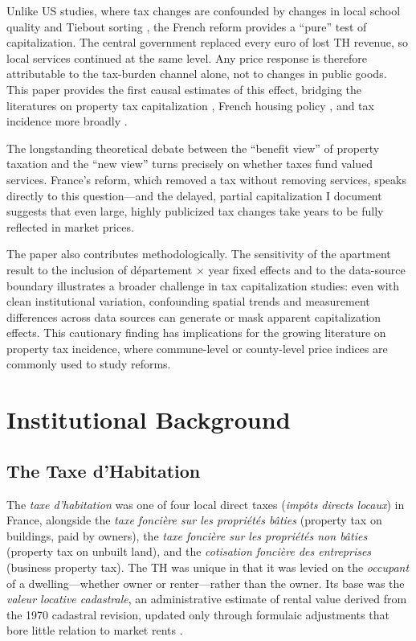 \documentclass[12pt]{article}
\begin{document}
Unlike US studies, where tax changes are confounded by changes in local school quality and Tiebout sorting \citep{oates1969effects, palmon1998property, cellini2010value}, the French reform provides a ``pure'' test of capitalization. The central government replaced every euro of lost TH revenue, so local services continued at the same level. Any price response is therefore attributable to the tax-burden channel alone, not to changes in public goods. This paper provides the first causal estimates of this effect, bridging the literatures on property tax capitalization \citep{hilber2017impact, bradbury2001property}, French housing policy \citep{beaubrun2014residential, bach2023suppression, bonnet2021land}, and tax incidence more broadly \citep{suarez2016benefits, fuest2018property}.

The longstanding theoretical debate between the ``benefit view'' of property taxation \citep{tiebout1956pure, yinger1982capitalization} and the ``new view'' \citep{zodrow2001property} turns precisely on whether taxes fund valued services. France's reform, which removed a tax without removing services, speaks directly to this question---and the delayed, partial capitalization I document suggests that even large, highly publicized tax changes take years to be fully reflected in market prices.

The paper also contributes methodologically. The sensitivity of the apartment result to the inclusion of d\'{e}partement $\times$ year fixed effects and to the data-source boundary illustrates a broader challenge in tax capitalization studies: even with clean institutional variation, confounding spatial trends and measurement differences across data sources can generate or mask apparent capitalization effects. This cautionary finding has implications for the growing literature on property tax incidence, where commune-level or county-level price indices are commonly used to study reforms.

\section{Institutional Background}

\subsection{The Taxe d'Habitation}

The \emph{taxe d'habitation} was one of four local direct taxes (\emph{imp\^{o}ts directs locaux}) in France, alongside the \emph{taxe fonci\`{e}re sur les propri\'{e}t\'{e}s b\^{a}ties} (property tax on buildings, paid by owners), the \emph{taxe fonci\`{e}re sur les propri\'{e}t\'{e}s non b\^{a}ties} (property tax on unbuilt land), and the \emph{cotisation fonci\`{e}re des entreprises} (business property tax). The TH was unique in that it was levied on the \emph{occupant} of a dwelling---whether owner or renter---rather than the owner. Its base was the \emph{valeur locative cadastrale}, an administrative estimate of rental value derived from the 1970 cadastral revision, updated only through formulaic adjustments that bore little relation to market rents \citep{beaubrun2014residential}.
\end{document}
